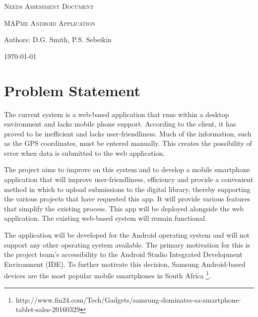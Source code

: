\documentclass[12pt,a4paper,oneside]{report}
\begin{document}
\begin{titlepage}
	\centering
	{\scshape\LARGE Needs Assessment Document \par}
	\vspace{1cm}
	{\scshape\Large MAPme Android Application\par}
	\vspace{1.5cm}
	{\LARGE Authors: D.G. Smith, P.S. Sebeikin\par}
	\vspace{2cm}
	{\large \today\par}
\end{titlepage}
\tableofcontents
\pagebreak
\section{Problem Statement}
  \begin{spacing}{1.4}
    The current system is a web-based application that runs within a desktop environment and lacks mobile phone support.  According to the client, it has proved to be inefficient and lacks user-friendliness.  Much of the information, such as the GPS coordinates, must be entered manually.  This creates the possibility of error when data is submitted to the web application.

    The project aims to improve on this system and to develop a mobile smartphone application that will improve user-friendliness, efficiency and provide a convenient method in which to upload submissions to the digital library, thereby supporting the various projects that have requested this app.  It will provide various features that simplify the existing process.  This app will be deployed alongside the web application.  The existing web-based system will remain functional.

    The application will be developed for the Android operating system and will not support any other operating system available. The primary motivation for this is the project team's accessibility to the Android Studio Integrated Development Environment (IDE).  To further motivate this decision, Samsung Android-based devices are the most popular mobile smartphones in South Africa \footnote{http://www.fin24.com/Tech/Gadgets/samsung-dominates-sa-smartphone-tablet-sales-20160329}.
  \end{spacing}

\end{document}

